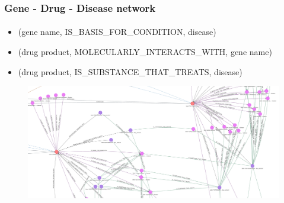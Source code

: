 \documentclass[aspectratio=169,xcolor=dvipsnames]{beamer}
\begin{document}
\begin{frame}
  \frametitle{Gene - Drug - Disease network}
  \framesubtitle{}
  \begin{itemize}\tiny
  \item[] (gene name, IS\_BASIS\_FOR\_CONDITION, disease)
  \item[] (drug product, MOLECULARLY\_INTERACTS\_WITH, gene name)
  \item[] (drug product, IS\_SUBSTANCE\_THAT\_TREATS, disease)
  \end{itemize}
  \begin{figure}
    \begin{center}
      \includegraphics[height=0.6\textheight]{gene-drug-disease.jpeg}
    \end{center}
  \end{figure}
\end{frame}







\end{document}
